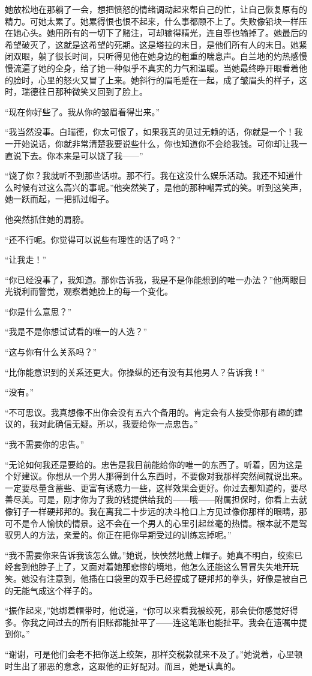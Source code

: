 \par 她放松地在那躺了一会，想把愤怒的情绪调动起来帮自己的忙，让自己恢复原有的精力。可她太累了。她累得恨也恨不起来，什么事都顾不上了。失败像铅块一样压在她心头。她用所有的一切下了赌注，可却输得精光，连自尊也输掉了。她最后的希望破灭了，这就是这希望的死期。这是塔拉的末日，是他们所有人的末日。她紧闭双眼，躺了很长时间，只听得见他在她身边的粗重的喘息声。白兰地的灼热感慢慢流遍了她的全身，给了她一种似乎不真实的力气和温暖。当她最终睁开眼看着他的脸时，心里的怒火又冒了上来。她斜行的眉毛蹙在一起，成了皱眉头的样子，这时，瑞德往日那种微笑又回到了脸上。
\par “现在你好些了。我从你的皱眉看得出来。”
\par “我当然没事。白瑞德，你太可恨了，如果我真的见过无赖的话，你就是一个！我一开始说话，你就非常清楚我要说些什么，你也知道你不会给我钱。可你却让我一直说下去。你本来是可以饶了我——”
\par “饶了你？我就听不到那些话啦。那不行。我在这没什么娱乐活动。我还不知道什么时候有过这么高兴的事呢。”他突然笑了，是他的那种嘲弄式的笑。听到这笑声，她一跃而起，一把抓过帽子。
\par 他突然抓住她的肩膀。
\par “还不行呢。你觉得可以说些有理性的话了吗？”
\par “让我走！”
\par “你已经没事了，我知道。那你告诉我，我是不是你能想到的唯一办法？”他两眼目光锐利而警觉，观察着她脸上的每一个变化。
\par “你是什么意思？”
\par “我是不是你想试试看的唯一的人选？”
\par “这与你有什么关系吗？”
\par “比你能意识到的关系还更大。你操纵的还有没有其他男人？告诉我！”
\par “没有。”
\par “不可思议。我真想像不出你会没有五六个备用的。肯定会有人接受你那有趣的建议的，我对此确信无疑。所以，我要给你一点忠告。”
\par “我不需要你的忠告。”
\par “无论如何我还是要给的。忠告是我目前能给你的唯一的东西了。听着，因为这是个好建议。你想从一个男人那得到什么东西时，不要像对我那样突然间就说出来。一定要尽量含蓄些、更富有诱惑力一些，这样效果会更好。你过去都知道的，要尽善尽美。可是，刚才你为了我的钱提供给我的——哦——附属担保时，你看上去就像钉子一样硬邦邦的。我在离我二十步远的决斗枪口上方见过像你那样的眼睛，那可不是令人愉快的情景。这不会在一个男人的心里引起丝毫的热情。根本就不是驾驭男人的方法，亲爱的。你正在把你早期受过的训练忘掉呢。”
\par “我不需要你来告诉我该怎么做。”她说，怏怏然地戴上帽子。她真不明白，绞索已经套到他脖子上了，又面对着她那悲惨的境地，他怎么还能这么冒冒失失地开玩笑。她没有注意到，他插在口袋里的双手已经握成了硬邦邦的拳头，好像是被自己的无能气成这个样子的。
\par “振作起来，”她绑着帽带时，他说道，“你可以来看我被绞死，那会使你感觉好得多。你我之间过去的所有旧账都能扯平了——连这笔账也能扯平。我会在遗嘱中提到你。”
\par “谢谢，可是他们会老不把你送上绞架，那样交税款就来不及了。”她说着，心里顿时生出了邪恶的意念，这跟他的正好配对。而且，她是认真的。

